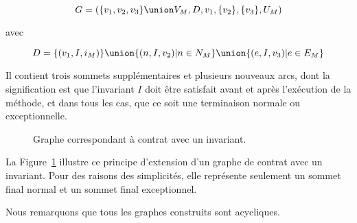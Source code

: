 $$G = (
  \{v_1, v_2, v_3\} \union V_M,
  D,
  v_1,
  \{v_2\},
  \{v_3\},
  U_M
)$$

avec

$$D = \{(v_1, I, i_M)\} \union
      \{(n, I, v_2) \vert n \in N_M\} \union
      \{(e, I, v_3) \vert e \in E_M\}$$

Il contient trois sommets supplémentaires et plusieurs nouveaux arcs, dont la
signification est que l'invariant $I$ doit être satisfait avant et après
l'exécution de la méthode, et dans tous les cas, que ce soit une terminaison
normale ou exceptionnelle.

\begin{figure}


\caption{\label{figure:test:invariant_graph} Graphe correspondant à contrat avec
un invariant.}

\end{figure}

La Figure~\ref{figure:test:invariant_graph} illustre ce principe d'extension
d'un graphe de contrat avec un invariant. Pour des raisons des simplicités, elle
représente seulement un sommet final normal et un sommet final exceptionnel.

Nous remarquons que tous les graphes construits sont acycliques.
